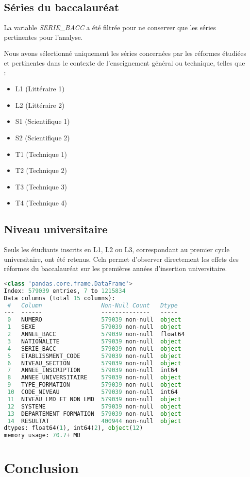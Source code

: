 \subsection{Séries du baccalauréat}
La variable \textit{SERIE\_BACC} a été filtrée pour ne conserver que les séries pertinentes pour l’analyse.

Nous avons sélectionné uniquement les séries concernées par les réformes étudiées et pertinentes dans le contexte de l’enseignement général ou technique, telles que :
\begin{itemize}
\item L1 (Littéraire 1)
\item L2 (Littéraire 2)
\item S1 (Scientifique 1)
\item S2 (Scientifique 2)
\item T1 (Technique 1)  
\item T2 (Technique 2)
\item T3 (Technique 3)
\item T4 (Technique 4)
\end{itemize}

\subsection{Niveau universitaire}

Seuls les étudiants inscrits en L1, L2 ou L3, correspondant au premier cycle universitaire, ont été retenus. 
Cela permet d’observer directement les effets des réformes du baccalauréat sur les premières années d’insertion universitaire.

\newpage
\begin{lstlisting}[language=Python,
    caption=Filtrage des données,
    label=lst:filtrage,
    basicstyle=\ttfamily\small,
    backgroundcolor=\color{gray!10}
]
<class 'pandas.core.frame.DataFrame'>
Index: 579039 entries, 7 to 1215834
Data columns (total 15 columns):
 #   Column                 Non-Null Count   Dtype  
---  ------                 --------------   -----  
 0   NUMERO                 579039 non-null  object 
 1   SEXE                   579039 non-null  object 
 2   ANNEE_BACC             579039 non-null  float64
 3   NATIONALITE            579039 non-null  object 
 4   SERIE_BACC             579039 non-null  object 
 5   ETABLISSMENT_CODE      579039 non-null  object 
 6   NIVEAU_SECTION         579039 non-null  object 
 7   ANNEE_INSCRIPTION      579039 non-null  int64  
 8   ANNEE UNIVERSITAIRE    579039 non-null  object 
 9   TYPE_FORMATION         579039 non-null  object 
 10  CODE_NIVEAU            579039 non-null  int64  
 11  NIVEAU LMD ET NON LMD  579039 non-null  object 
 12  SYSTEME                579039 non-null  object 
 13  DEPARTEMENT FORMATION  579039 non-null  object 
 14  RESULTAT               400944 non-null  object 
dtypes: float64(1), int64(2), object(12)
memory usage: 70.7+ MB
\end{lstlisting}

\section{Conclusion}